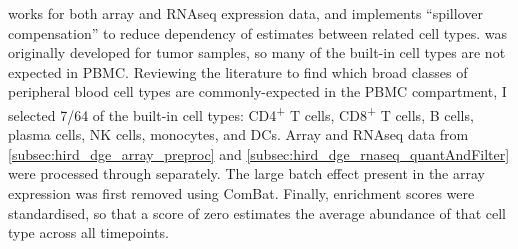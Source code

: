 works for both array and \gls{RNAseq} expression data,
and implements \enquote{spillover compensation} to reduce dependency of estimates between related cell types\autocite{aran2017XCellDigitallyPortraying}.
%
%
 was originally developed for tumor samples, so many of the built-in cell types are not expected in \gls{PBMC}.
Reviewing the literature to find which broad classes of peripheral blood cell types are commonly-expected in the \gls{PBMC} compartment\autocite{kleiveland2015PeripheralBloodMononuclear,vanderwijst2018SinglecellRNASequencing,davenport2018DiscoveringVivoCytokineeQTL},
I selected 7/64 of the built-in cell types: CD4\textsuperscript{+} T cells, CD8\textsuperscript{+} T cells, B cells, plasma cells, \gls{NK} cells, monocytes, and \glspl{DC}.
Array and \gls{RNAseq} data from \cref{subsec:hird_dge_array_preproc} and \cref{subsec:hird_dge_rnaseq_quantAndFilter} were processed through  separately.
The large batch effect present in the array expression was first removed using ComBat.
Finally, enrichment scores were standardised, so that a score of zero estimates the average abundance of that cell type across all timepoints.

%


